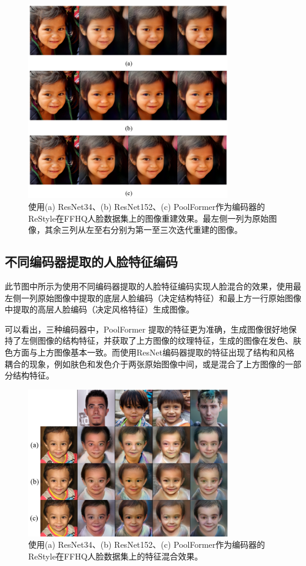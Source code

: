 \begin{figure}[htb]
\centering 
\includegraphics[width=0.8\textwidth]{img/m3p7.png} 
\caption{使用(a) ResNet34、(b) ResNet152、(c) PoolFormer作为编码器的ReStyle在FFHQ人脸数据集上的图像重建效果。最左侧一列为原始图像，其余三列从左至右分别为第一至三次迭代重建的图像。}
\label{Test}
\end{figure}

\subsection{不同编码器提取的人脸特征编码}

此节图中所示为使用不同编码器提取的人脸特征编码实现人脸混合的效果，使用最左侧一列原始图像中提取的底层人脸编码（决定结构特征）和最上方一行原始图像中提取的高层人脸编码（决定风格特征）生成图像。

可以看出，三种编码器中，PoolFormer 提取的特征更为准确，生成图像很好地保持了左侧图像的结构特征，并获取了上方图像的纹理特征，生成的图像在发色、肤色方面与上方图像基本一致。而使用ResNet编码器提取的特征出现了结构和风格耦合的现象，例如肤色和发色介于两张原始图像中间，或是混合了上方图像的一部分结构特征。

\begin{figure}[htb]
\centering 
\includegraphics[width=0.8\textwidth]{img/m3p8.png} 
\caption{使用(a) ResNet34、(b) ResNet152、(c) PoolFormer作为编码器的ReStyle在FFHQ人脸数据集上的特征混合效果。}
\label{Test}
\end{figure}




